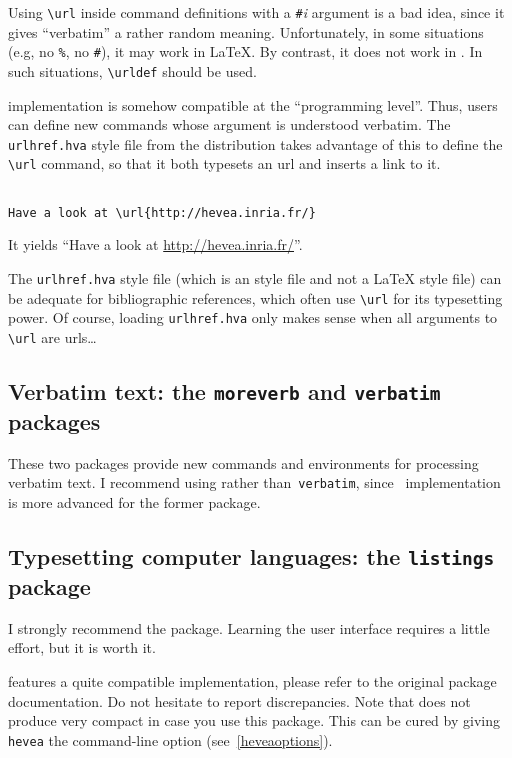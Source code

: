 Using \verb+\url+ inside command definitions with a
\verb+#+\textit{i} argument is a bad idea, since
it gives ``verbatim'' a rather random meaning.
Unfortunately, in some situations (e.g, no \verb+%+, no \verb+#+),
it may work in \LaTeX{}. By
contrast, it does not work in \hevea{}. In such situations,
\verb+\urldef+ should be used.

\hevea{} implementation is somehow compatible at the ``programming level''.
Thus, users can define new commands whose argument is understood
verbatim. The \texttt{urlhref.hva} style file
from the distribution
takes advantage of this to define the \verb+\url+ command, so that it both
typesets an url and inserts a link to it.
\begin{htmlonly}
\begin{verbatim}

Have a look at \url{http://hevea.inria.fr/}
\end{verbatim}
It yields ``Have a look at \url{http://hevea.inria.fr/}''.
\end{htmlonly}
The \texttt{urlhref.hva}
style file (which is an \hevea{} style file and not a \LaTeX{}
style file) can be adequate for bibliographic references,
which often use \verb+\url+ for its typesetting power.
Of course, loading \texttt{urlhref.hva} only makes sense when
all arguments to \verb+\url+ are urls\ldots

\subsection{Verbatim text: the \texttt{moreverb} and
\texttt{verbatim} packages}
These two packages provide new commands and environments for
processing verbatim text.
I recommend using
rather than~\texttt{verbatim},
since \hevea~implementation is more advanced for the former package.



\subsection{Typesetting \label{listings:package}computer languages: the \texttt{listings} package}
%
I strongly recommend the
 package.
Learning the user interface requires a little effort, but it is worth
it.

\hevea{} features a quite compatible implementation, please refer to
the original package documentation.
Do not hesitate to report discrepancies.
Note that \hevea{} does not produce very compact
\html{} in case you use this package.
This can be cured by
giving \texttt{hevea} the command-line option 
(see~\ref{heveaoptions}).

